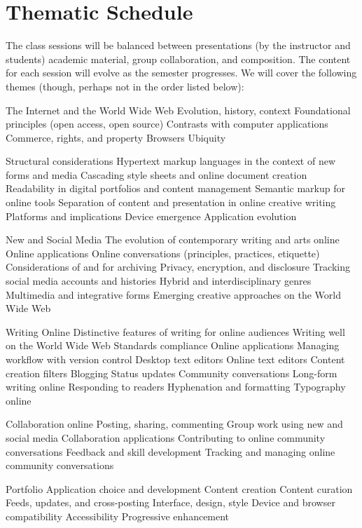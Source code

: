 \documentclass[letterpaper,10pt,headsepline]{scrreprt}
\begin{document}
\section{Thematic Schedule}
The class sessions will be balanced between presentations (by the instructor and students) academic material, group collaboration, and composition. The content for each session will evolve as the semester progresses. We will cover the following themes (though, perhaps not in the order listed below):
\\
\begin{compactdesc}

\item[The Internet and the World Wide Web]
Evolution, history, context
Foundational principles (open access, open source)
Contrasts with computer applications
Commerce, rights, and property
Browsers
Ubiquity
\\
\item[Structural considerations]
Hypertext markup languages in the context of new forms and media
Cascading style sheets and online document creation
Readability in digital portfolios and content management
Semantic markup for online tools
Separation of content and presentation in online creative writing
Platforms and implications
Device emergence
Application evolution
\\
\item[New and Social Media]
The evolution of contemporary writing and arts online
Online applications
Online conversations (principles, practices, etiquette)
Considerations of and for archiving
Privacy, encryption, and disclosure
Tracking social media accounts and histories
Hybrid and interdisciplinary genres
Multimedia and integrative forms
Emerging creative approaches on the World Wide Web
\\
\item[Writing Online]
Distinctive features of writing for online audiences
Writing well on the World Wide Web
Standards compliance
Online applications
Managing workflow with version control
Desktop text editors
Online text editors
Content creation filters
Blogging
Status updates
Community conversations
Long-form writing online
Responding to readers
Hyphenation and formatting
Typography online
\\
\item[Collaboration online]
Posting, sharing, commenting
Group work using new and social media
Collaboration applications
Contributing to online community conversations
Feedback and skill development
Tracking and managing online community conversations
\\
\item[Portfolio]
Application choice and development
Content creation
Content curation
Feeds, updates, and cross-posting
Interface, design, style
Device and browser compatibility
Accessibility
Progressive enhancement

\end{compactdesc}
\clearpage
\end{document}
